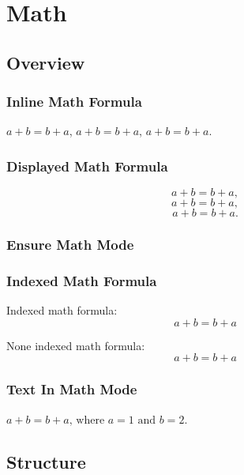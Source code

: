 \section{Math}
\subsection{Overview}
\subsubsection{Inline Math Formula}
$a+b=b+a$, \(a+b=b+a\), \begin{math}a+b=b+a\end{math}.

\subsubsection{Displayed Math Formula}
$$
a+b=b+a,
$$
\[
    a+b=b+a,
\]
\begin{displaymath}
    a+b=b+a.
\end{displaymath}

\subsubsection{Ensure Math Mode}

\subsubsection{Indexed Math Formula}
Indexed math formula:
\begin{equation}
    a+b=b+a \label{eq:commutative}  %
\end{equation}

None indexed math formula:
\begin{equation*}
    a+b=b+a %
\end{equation*}

\subsubsection{Text In Math Mode}
$ a + b = b + a \text{, where } a = 1 \text{ and } b = 2 $.

\subsection{Structure}
